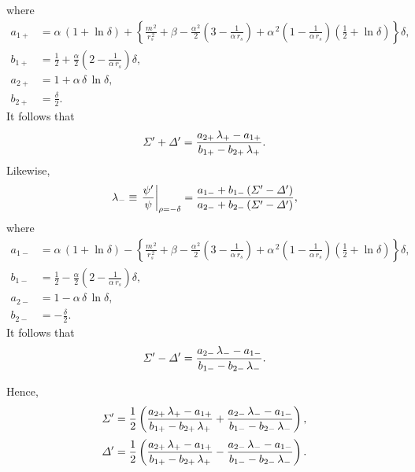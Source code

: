 \documentclass[notitlepage,12pt]{article}
\begin{document}
where
\begin{align}
a_{1+}&= \alpha\,(1+\ln\delta)+\left\{
\frac{m^{\,2}}{r_s^{\,2}} +\beta - \frac{\alpha^{\,2}}{2}\left(3-\frac{1}{\alpha\,r_s}\right)
+\alpha^{\,2}\left(1-\frac{1}{\alpha\,r_s}\right)\left(\frac{1}{2}+\ln\delta\right)\right\}\delta,\\[0.5ex]
b_{1+} &=\frac{1}{2}+ \frac{\alpha}{2}\left(2-\frac{1}{\alpha\,r_s}\right)\delta,\\[0.5ex]
a_{2+} &= 1+\alpha\,\delta\,\ln\delta,\\[0.5ex]
b_{2+} &= \frac{\delta}{2}.
\end{align}
It follows that
\begin{equation}
{\mit\Sigma}'+ {\mit\Delta}' = \frac{a_{2+}\,\lambda_+ - a_{1+}}{b_{1+}-b_{2+}\,\lambda_+}.
\end{equation}
Likewise,
\begin{equation}
\lambda_-\equiv \left.\frac{\psi'}{\psi}\right|_{\rho =-\delta} = \frac{a_{1-}+b_{1-}\,({\mit\Sigma}'-{\mit\Delta'})}{a_{2-}+ b_{2-}\,({\mit\Sigma}'-{\mit\Delta'})},
\end{equation}
where
\begin{align}
a_{1-}&= \alpha\,(1+\ln\delta)-\left\{
\frac{m^{\,2}}{r_s^{\,2}} +\beta - \frac{\alpha^{\,2}}{2}\left(3-\frac{1}{\alpha\,r_s}\right)
+\alpha^{\,2}\left(1-\frac{1}{\alpha\,r_s}\right)\left(\frac{1}{2}+\ln\delta\right)\right\}\delta,\\[0.5ex]
b_{1-} &=\frac{1}{2}- \frac{\alpha}{2}\left(2-\frac{1}{\alpha\,r_s}\right)\delta,\\[0.5ex]
a_{2-} &= 1-\alpha\,\delta\,\ln\delta,\\[0.5ex]
b_{2-} &= -\frac{\delta}{2}.
\end{align}
It follows that
\begin{equation}
{\mit\Sigma}'- {\mit\Delta}' = \frac{a_{2-}\,\lambda_- - a_{1-}}{b_{1-}-b_{2-}\,\lambda_-}.
\end{equation}

Hence, 
\begin{align}
{\mit\Sigma}' &= \frac{1}{2}\left(\frac{a_{2+}\,\lambda_+ - a_{1+}}{b_{1+}-b_{2+}\,\lambda_+}+\frac{a_{2-}\,\lambda_- - a_{1-}}{b_{1-}-b_{2-}\,\lambda_-}\right),\\[0.5ex]
{\mit\Delta}'&=\frac{1}{2}\left(\frac{a_{2+}\,\lambda_+ - a_{1+}}{b_{1+}-b_{2+}\,\lambda_+}-\frac{a_{2-}\,\lambda_- - a_{1-}}{b_{1-}-b_{2-}\,\lambda_-}\right).
\end{align}
\end{document}
